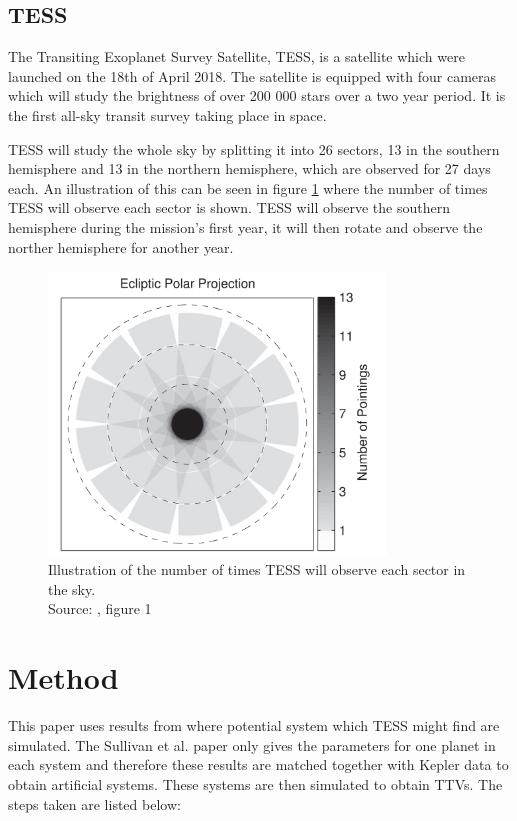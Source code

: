 \documentclass[12pt]{report}
\begin{document}
	
\section{TESS}
	The Transiting Exoplanet Survey Satellite, TESS, is a satellite which were launched on the 18th of April 2018. The satellite is equipped with four cameras which will study the brightness of over 200 000 stars over a two year period. It is the first all-sky transit survey taking place in space. \citep{2014SPIE.9143E..20R}
	
	TESS will study the whole sky by splitting it into 26 sectors, 13 in the southern hemisphere and 13 in the northern hemisphere, which are observed for 27 days each. An illustration of this can be seen in figure \ref{fig:tess_time} where the number of times TESS will observe each sector is shown. TESS will observe the southern hemisphere during the mission's first year, it will then rotate and observe the norther hemisphere for another year.
	\begin{figure}[h!]
	\centering
		\includegraphics[width=0.8\textwidth]{img/tess_observe_time.png}
		\caption{Illustration of the number of times TESS will observe each sector in the sky.\\ \small{Source: \cite{2015ApJ...809...77S}, figure 1}}
		\label{fig:tess_time}
	\end{figure}	
	
\chapter{Method}
	This paper uses results from \cite{2015ApJ...809...77S} where potential system which TESS might find are simulated. The Sullivan et al. paper only gives the parameters for one planet in each system and therefore these results are matched together with Kepler data to obtain artificial systems. These systems are then simulated to obtain TTVs. The steps taken are listed below:
	
\end{document}
